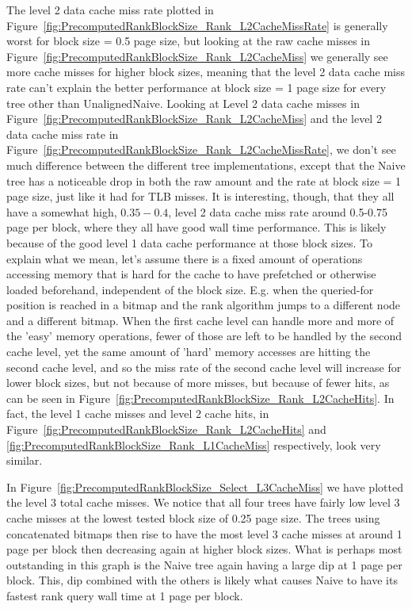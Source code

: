 The level 2 data cache miss rate plotted in Figure~\ref{fig:PrecomputedRankBlockSize_Rank_L2CacheMissRate} is generally worst for block size = 0.5 page size, but looking at the raw cache misses in Figure~\ref{fig:PrecomputedRankBlockSize_Rank_L2CacheMiss} we generally see more cache misses for higher block sizes, meaning that the level 2 data cache miss rate can't explain the better performance at block size = 1 page size for every tree other than UnalignedNaive.
Looking at Level 2 data cache misses in Figure~\ref{fig:PrecomputedRankBlockSize_Rank_L2CacheMiss} and the level 2 data cache miss rate in Figure~\ref{fig:PrecomputedRankBlockSize_Rank_L2CacheMissRate}, we don't see much difference between the different tree implementations, except that the Naive tree has a noticeable drop in both the raw amount and the rate at block size = 1 page size, just like it had for TLB misses.
It is interesting, though, that they all have a somewhat high, $0.35-0.4$, level 2 data cache miss rate around 0.5-0.75 page per block, where they all have good wall time performance.
This is likely because of the good level 1 data cache performance at those block sizes.
To explain what we mean, let's assume there is a fixed amount of operations accessing memory that is hard for the cache to have prefetched or otherwise loaded beforehand, independent of the block size.
E.g. when the queried-for position is reached in a bitmap and the rank algorithm jumps to a different node and a different bitmap.
When the first cache level can handle more and more of the 'easy' memory operations, fewer of those are left to be handled by the second cache level, yet the same amount of 'hard' memory accesses are hitting the second cache level, and so the miss rate of the second cache level will increase for lower block sizes, but not because of more misses, but because of fewer hits, as can be seen in Figure~\ref{fig:PrecomputedRankBlockSize_Rank_L2CacheHits}.
In fact, the level 1 cache misses and level 2 cache hits, in Figure~\ref{fig:PrecomputedRankBlockSize_Rank_L2CacheHits} and \ref{fig:PrecomputedRankBlockSize_Rank_L1CacheMiss} respectively, look very similar.

In Figure~\ref{fig:PrecomputedRankBlockSize_Select_L3CacheMiss} we have plotted the level 3 total cache misses.
We notice that all four trees have fairly low level 3 cache misses at the lowest tested block size of 0.25 page size.
The trees using concatenated bitmaps then rise to have the most level 3 cache misses at around 1 page per block then decreasing again at higher block sizes.
What is perhaps most outstanding in this graph is the Naive tree again having a large dip at 1 page per block.
This, dip combined with the others is likely what causes Naive to have its fastest rank query wall time at 1 page per block.


